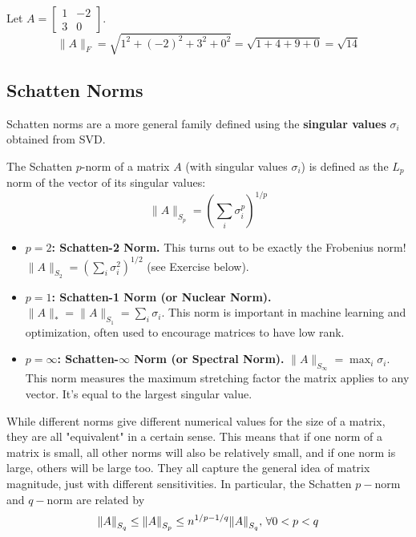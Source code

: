 \documentclass[11pt]{article}
\begin{document}
\begin{example}
Let $A = \begin{bmatrix} 1 & -2 \\ 3 & 0 \end{bmatrix}$.
\[ \|A\|_F = \sqrt{1^2 + (-2)^2 + 3^2 + 0^2} = \sqrt{1 + 4 + 9 + 0} = \sqrt{14} \]
\end{example}

\subsection{Schatten Norms}
Schatten norms are a more general family defined using the \textbf{singular values} $\sigma_i$ obtained from SVD.

\begin{definition}
    The Schatten $p$-norm of a matrix $A$ (with singular values $\sigma_i$) is defined as the $L_p$ norm of the vector of its singular values:
\[
\|A\|_{S_p} = \left( \sum_i \sigma_i^p \right)^{1/p}
\]
\end{definition} 

\begin{example}
\begin{itemize}
    \item \textbf{$p=2$: Schatten-2 Norm.} This turns out to be exactly the Frobenius norm! $\|A\|_{S_2} = \left( \sum_i \sigma_i^2 \right)^{1/2}$ (see Exercise below).
    \item \textbf{$p=1$: Schatten-1 Norm (or Nuclear Norm).} $\|A\|_{*} = \|A\|_{S_1} = \sum_i \sigma_i$. This norm is important in machine learning and optimization, often used to encourage matrices to have low rank.
    \item \textbf{$p=\infty$: Schatten-$\infty$ Norm (or Spectral Norm).} $\|A\|_{S_\infty} = \max_i \sigma_i$. This norm measures the maximum stretching factor the matrix applies to any vector. It's equal to the largest singular value.
\end{itemize}
    
\end{example}
While different norms give different numerical values for the size of a matrix, they are all "equivalent" in a certain sense. This means that if one norm of a matrix is small, all other norms will also be relatively small, and if one norm is large, others will be large too. They all capture the general idea of matrix magnitude, just with different sensitivities. In particular, the Schatten $p-$norm and $q-$norm are related by
\begin{align*}
    {\| A \|}_{S_q} \leq {\| A \|}_{S_p} \leq n^{1/p-1/q}{\| A \|}_{S_q}, \,  \forall 0<p<q
\end{align*}
\end{document}
